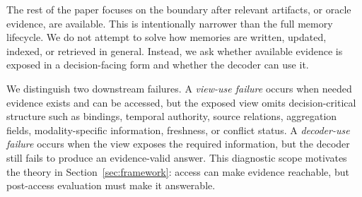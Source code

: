 The rest of the paper focuses on the boundary after relevant artifacts, or oracle evidence, are available.
This is intentionally narrower than the full memory lifecycle.
We do not attempt to solve how memories are written, updated, indexed, or retrieved in general.
Instead, we ask whether available evidence is exposed in a decision-facing form and whether the decoder can use it.

We distinguish two downstream failures.
A \emph{view-use failure} occurs when needed evidence exists and can be accessed, but the exposed view omits decision-critical structure such as bindings, temporal authority, source relations, aggregation fields, modality-specific information, freshness, or conflict status.
A \emph{decoder-use failure} occurs when the view exposes the required information, but the decoder still fails to produce an evidence-valid answer.
This diagnostic scope motivates the theory in Section~\ref{sec:framework}: access can make evidence reachable, but post-access evaluation must make it answerable.

